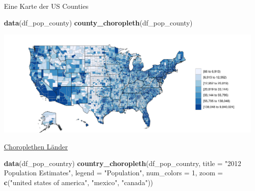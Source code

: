 \documentclass[ignorenonframetext,]{beamer}
\newenvironment{Shaded}{\begin{snugshade}}{\end{snugshade}}
\newcommand{\DataTypeTok}[1]{\textcolor[rgb]{0.13,0.29,0.53}{#1}}
\newcommand{\DecValTok}[1]{\textcolor[rgb]{0.00,0.00,0.81}{#1}}
\newcommand{\KeywordTok}[1]{\textcolor[rgb]{0.13,0.29,0.53}{\textbf{#1}}}
\newcommand{\NormalTok}[1]{#1}
\newcommand{\StringTok}[1]{\textcolor[rgb]{0.31,0.60,0.02}{#1}}
\begin{document}
\begin{frame}[fragile]{Eine Karte der US Counties}
\protect\hypertarget{eine-karte-der-us-counties}{}

\begin{Shaded}
\begin{Highlighting}[]
\KeywordTok{data}\NormalTok{(df_pop_county)}
\KeywordTok{county_choropleth}\NormalTok{(df_pop_county)}
\end{Highlighting}
\end{Shaded}

\includegraphics{Choroplethen_files/figure-beamer/unnamed-chunk-24-1.pdf}

\end{frame}

\begin{frame}[fragile]{\href{http://mirrors.softliste.de/cran/web/packages/choroplethr/vignettes/d-country-choropleth.html}{Choroplethen
Länder}}
\protect\hypertarget{choroplethen-lander}{}

\begin{Shaded}
\begin{Highlighting}[]
\KeywordTok{data}\NormalTok{(df_pop_country)}
\KeywordTok{country_choropleth}\NormalTok{(df_pop_country,}
              \DataTypeTok{title      =} \StringTok{"2012 Population Estimates"}\NormalTok{,}
              \DataTypeTok{legend     =} \StringTok{"Population"}\NormalTok{,}
              \DataTypeTok{num_colors =} \DecValTok{1}\NormalTok{,}
              \DataTypeTok{zoom       =} \KeywordTok{c}\NormalTok{(}\StringTok{"united states of america"}\NormalTok{,}
                             \StringTok{"mexico"}\NormalTok{, }\StringTok{"canada"}\NormalTok{))}
\end{Highlighting}
\end{Shaded}

\end{frame}
\end{document}
